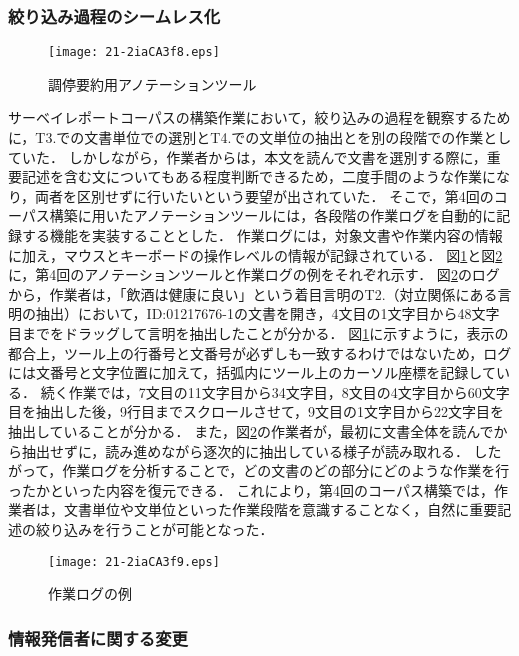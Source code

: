 \documentclass[japanese]{jnlp_1.4}
\begin{document}
\subsubsection{絞り込み過程のシームレス化}

\begin{figure}[t]
\begin{center}
\texttt{[image: 21-2iaCA3f8.eps]}
\end{center}
\caption{調停要約用アノテーションツール}
\label{fg:MS_tool}
\end{figure}

サーベイレポートコーパスの構築作業において，絞り込みの過程を観察するために，T3.での文書単位での選別とT4.での文単位の抽出とを別の段階での作業としていた．
しかしながら，作業者からは，本文を読んで文書を選別する際に，重要記述を含む文についてもある程度判断できるため，二度手間のような作業になり，両者を区別せずに行いたいという要望が出されていた．
そこで，第4回のコーパス構築に用いたアノテーションツールには，各段階の作業ログを自動的に記録する機能を実装することとした．
作業ログには，対象文書や作業内容の情報に加え，マウスとキーボードの操作レベルの情報が記録されている．
{図}\ref{fg:MS_tool}と図\ref{fg:log}に，第4回のアノテーションツールと作業ログの例をそれぞれ示す．
図\ref{fg:log}のログから，作業者は，「飲酒は健康に良い」という着目言明のT2.（対立関係にある言明の抽出）において，ID:01217676-1の文書を開き，4文目の1文字目から48文字目までをドラッグして言明を抽出したことが分かる．
図\ref{fg:MS_tool}に示すように，表示の都合上，ツール上の行番号と文番号が必ずしも一致するわけではないため，ログには文番号と文字位置に加えて，括弧内にツール上のカーソル座標を記録している．
続く作業では，7文目の11文字目から34文字目，8文目の4文字目から60文字目を抽出した後，9行目までスクロールさせて，9文目の1文字目から22文字目を抽出していることが分かる．
また，図\ref{fg:log}の作業者が，最初に文書全体を読んでから抽出せずに，読み進めながら逐次的に抽出している様子が読み取れる．
したがって，作業ログを分析することで，どの文書のどの部分にどのような作業を行ったかといった内容を復元できる．
これにより，第4回のコーパス構築では，作業者は，文書単位や文単位といった作業段階を意識することなく，自然に重要記述の絞り込みを行うことが可能となった．

\begin{figure}[t]
\begin{center}
\texttt{[image: 21-2iaCA3f9.eps]}
\end{center}
 \caption{作業ログの例}
 \label{fg:log}
\end{figure}


\subsubsection{情報発信者に関する変更}
\end{document}
